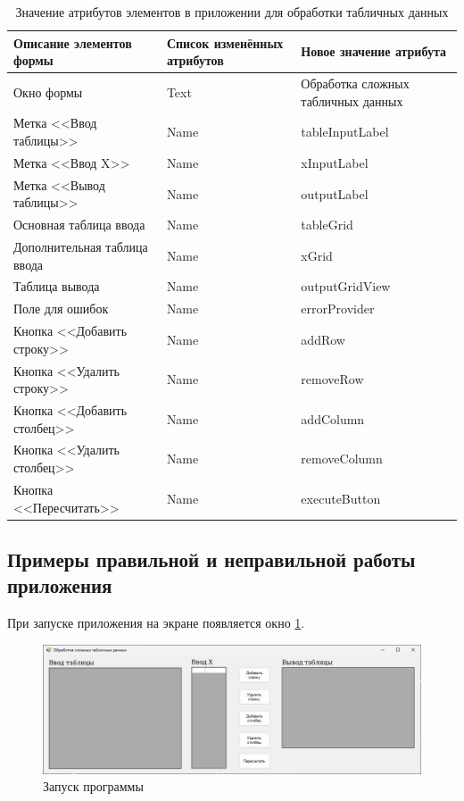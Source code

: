 \begin{table}
\centering
\begin{tabular}{|m{}|m{}|m{}|}
\hline
\textbf{Описание элементов формы} & \textbf{Список изменённых атрибутов} & \textbf{Новое значение атрибута} \\
\hline
\hline
Окно формы & Text & Обработка сложных табличных данных \\
Метка <<Ввод таблицы>> & Name & tableInputLabel \\
Метка <<Ввод X>> & Name & xInputLabel \\
Метка <<Вывод таблицы>> & Name & outputLabel \\
Основная таблица ввода & Name & tableGrid \\
Дополнительная таблица ввода & Name & xGrid \\
Таблица вывода & Name & outputGridView \\
Поле для ошибок & Name & errorProvider \\
Кнопка <<Добавить строку>> & Name & addRow \\
Кнопка <<Удалить строку>> & Name & removeRow \\
Кнопка <<Добавить столбец>> & Name & addColumn \\
Кнопка <<Удалить столбец>> & Name & removeColumn \\
Кнопка <<Пересчитать>> & Name & executeButton \\

\hline
\end{tabular}
\caption{Значение атрибутов элементов в приложении для обработки табличных данных}
\label{tab:handling-data-hard-form}
\end{table}

\subsection{Примеры правильной и неправильной работы приложения}
При запуске приложения на экране появляется окно \ref{fig:handling-data-hard-start}.

\begin{figure}
\centering
\includegraphics[width=0.5\linewidth]{images//handling-data-hard/start.png}
\caption{Запуск программы}
\label{fig:handling-data-hard-start}
\end{figure}

